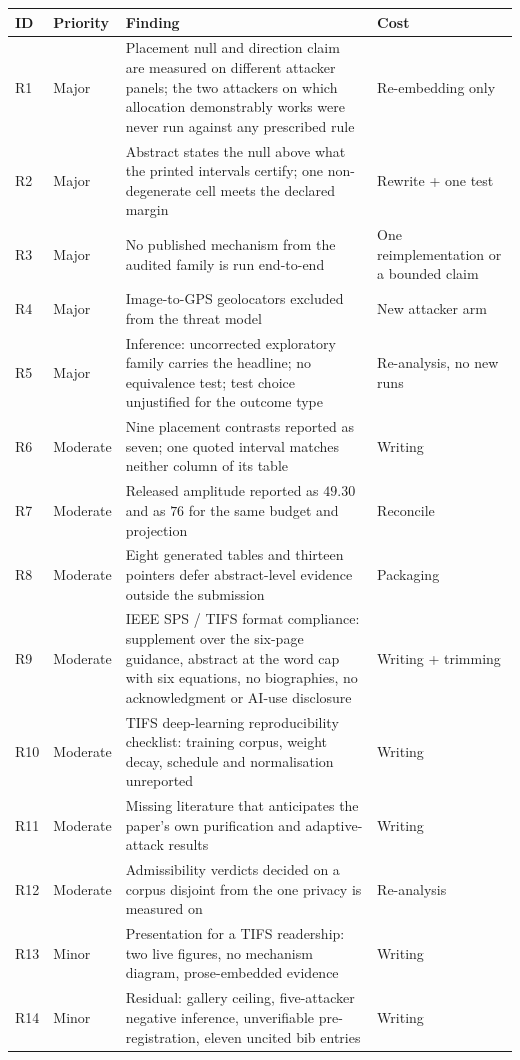 \documentclass[11pt,a4paper]{article}
\begin{document}
\begin{longtable}{L{0.055\textwidth} L{0.10\textwidth} L{0.56\textwidth} L{0.20\textwidth}}
\toprule
\textbf{ID} & \textbf{Priority} & \textbf{Finding} & \textbf{Cost} \\
\midrule
\endhead
R1 & Major & Placement null and direction claim are measured on different
attacker panels; the two attackers on which allocation demonstrably works were
never run against any prescribed rule & Re-embedding only \\
R2 & Major & Abstract states the null above what the printed intervals certify;
one non-degenerate cell meets the declared margin & Rewrite + one test \\
R3 & Major & No published mechanism from the audited family is run end-to-end &
One reimplementation or a bounded claim \\
R4 & Major & Image-to-GPS geolocators excluded from the threat model & New
attacker arm \\
R5 & Major & Inference: uncorrected exploratory family carries the headline;
no equivalence test; test choice unjustified for the outcome type & Re-analysis,
no new runs \\
R6 & Moderate & Nine placement contrasts reported as seven; one quoted interval
matches neither column of its table & Writing \\
R7 & Moderate & Released amplitude reported as $49.30$ and as $76$ for the same
budget and projection & Reconcile \\
R8 & Moderate & Eight generated tables and thirteen pointers defer
abstract-level evidence outside the submission & Packaging \\
R9 & Moderate & IEEE SPS / TIFS format compliance: supplement over the
six-page guidance, abstract at the word cap with six equations, no
biographies, no acknowledgment or AI-use disclosure & Writing + trimming \\
R10 & Moderate & TIFS deep-learning reproducibility checklist: training corpus,
weight decay, schedule and normalisation unreported & Writing \\
R11 & Moderate & Missing literature that anticipates the paper's own
purification and adaptive-attack results & Writing \\
R12 & Moderate & Admissibility verdicts decided on a corpus disjoint from the
one privacy is measured on & Re-analysis \\
R13 & Minor & Presentation for a TIFS readership: two live figures, no
mechanism diagram, prose-embedded evidence & Writing \\
R14 & Minor & Residual: gallery ceiling, five-attacker negative inference,
unverifiable pre-registration, eleven uncited bib entries & Writing \\
\bottomrule
\end{longtable}
\end{document}
